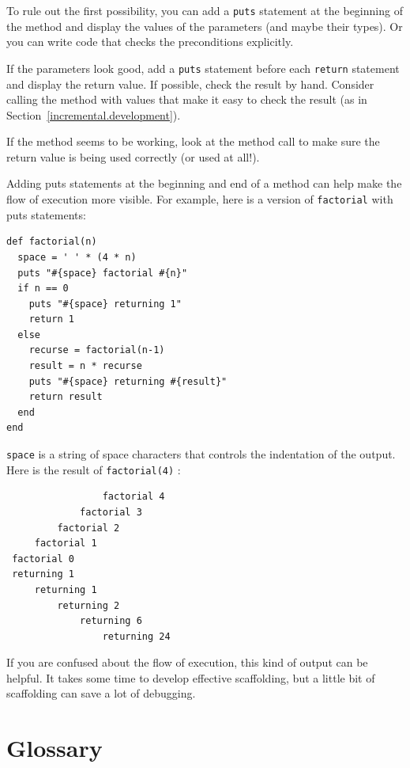 \documentclass[10pt]{book}
\begin{document}
To rule out the first possibility, you can add a {\tt puts} statement
at the beginning of the method and display the values of the
parameters (and maybe their types).  Or you can write code
that checks the preconditions explicitly.

If the parameters look good, add a {\tt puts} statement before each
{\tt return} statement and display the return value.  If
possible, check the result by hand.  Consider calling the
method with values that make it easy to check the result
(as in Section~\ref{incremental.development}).

If the method seems to be working, look at the method call
to make sure the return value is being used correctly (or used
at all!).

Adding puts statements at the beginning and end of a method
can help make the flow of execution more visible.
For example, here is a version of {\tt factorial} with
puts statements:

\begin{verbatim}
def factorial(n)
  space = ' ' * (4 * n)
  puts "#{space} factorial #{n}"
  if n == 0
    puts "#{space} returning 1"
    return 1
  else
    recurse = factorial(n-1)
    result = n * recurse
    puts "#{space} returning #{result}"
    return result
  end
end
\end{verbatim}
%
{\tt space} is a string of space characters that controls the
indentation of the output.  Here is the result of {\tt factorial(4)} :

\begin{verbatim}
                 factorial 4
             factorial 3
         factorial 2
     factorial 1
 factorial 0
 returning 1
     returning 1
         returning 2
             returning 6
                 returning 24
\end{verbatim}
%
If you are confused about the flow of execution, this kind of
output can be helpful.  It takes some time to develop effective
scaffolding, but a little bit of scaffolding can save a lot of debugging.


\section{Glossary}
\end{document}
